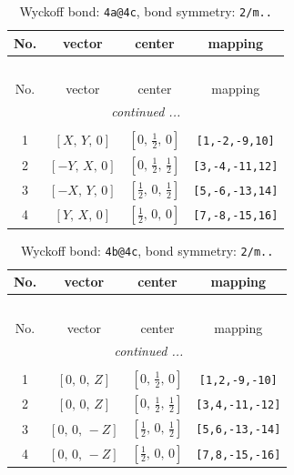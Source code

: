 \documentclass[fleqn,8pt]{jsarticle}
\begin{document}
\begin{longtable}{cccc}
\caption{Wyckoff bond: {\tt 4a@4c}, bond symmetry: {\tt 2/m..}}
 \\
 \hline \hline
No. & vector & center & mapping \\ \hline \endfirsthead

\multicolumn{3}{l}{\tablename\ \thetable{}} \\
 \hline \hline
No. & vector & center & mapping \\ \hline \endhead

 \hline \hline
\multicolumn{3}{r}{\footnotesize\it continued ...} \\ \endfoot

 \hline \hline
\multicolumn{3}{r}{} \\ \endlastfoot

1 & $\left[ X,\, Y,\, 0 \right]$ & $\left[ 0,\, \frac{1}{2},\, 0 \right]$ & {\tt [1,-2,-9,10]} \\ \hline
2 & $\left[ - Y,\, X,\, 0 \right]$ & $\left[ 0,\, \frac{1}{2},\, \frac{1}{2} \right]$ & {\tt [3,-4,-11,12]} \\ \hline
3 & $\left[ - X,\, Y,\, 0 \right]$ & $\left[ \frac{1}{2},\, 0,\, \frac{1}{2} \right]$ & {\tt [5,-6,-13,14]} \\ \hline
4 & $\left[ Y,\, X,\, 0 \right]$ & $\left[ \frac{1}{2},\, 0,\, 0 \right]$ & {\tt [7,-8,-15,16]} \\
\end{longtable}
\renewcommand{\arraystretch}{1.2}
\begin{longtable}{cccc}
\caption{Wyckoff bond: {\tt 4b@4c}, bond symmetry: {\tt 2/m..}}
 \\
 \hline \hline
No. & vector & center & mapping \\ \hline \endfirsthead

\multicolumn{3}{l}{\tablename\ \thetable{}} \\
 \hline \hline
No. & vector & center & mapping \\ \hline \endhead

 \hline \hline
\multicolumn{3}{r}{\footnotesize\it continued ...} \\ \endfoot

 \hline \hline
\multicolumn{3}{r}{} \\ \endlastfoot

1 & $\left[ 0,\, 0,\, Z \right]$ & $\left[ 0,\, \frac{1}{2},\, 0 \right]$ & {\tt [1,2,-9,-10]} \\ \hline
2 & $\left[ 0,\, 0,\, Z \right]$ & $\left[ 0,\, \frac{1}{2},\, \frac{1}{2} \right]$ & {\tt [3,4,-11,-12]} \\ \hline
3 & $\left[ 0,\, 0,\, - Z \right]$ & $\left[ \frac{1}{2},\, 0,\, \frac{1}{2} \right]$ & {\tt [5,6,-13,-14]} \\ \hline
4 & $\left[ 0,\, 0,\, - Z \right]$ & $\left[ \frac{1}{2},\, 0,\, 0 \right]$ & {\tt [7,8,-15,-16]} \\
\end{longtable}
\end{document}
